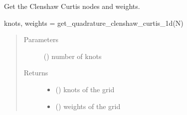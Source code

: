 \documentclass[letterpaper,10pt,english,openany,oneside]{sphinxmanual}
\begin{document}

\begin{fulllineitems}
\label{\detokenize{pygpc:pygpc.grid.get_quadrature_clenshaw_curtis_1d}}
Get the Clenshaw Curtis nodes and weights.

knots, weights = get\_quadrature\_clenshaw\_curtis\_1d(N)
\begin{quote}\begin{description}
\item[{Parameters}] \leavevmode
{} () \textendash{} number of knots

\item[{Returns}] \leavevmode
\begin{itemize}
\item {} 
 () \textendash{} knots of the grid

\item {} 
 () \textendash{} weights of the grid

\end{itemize}


\end{description}\end{quote}

\end{fulllineitems}

\end{document}
